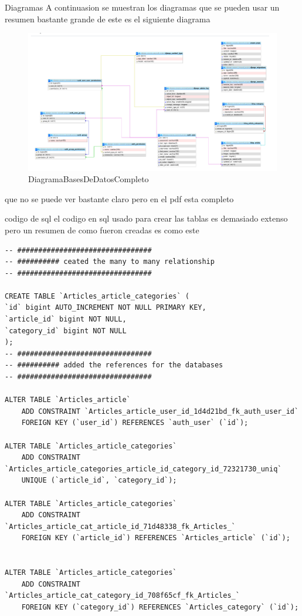 \documentclass[15pt]{extarticle}
\begin{document}
\begin{subsection}{Diagramas}
	A continuasion se muestran los diagramas que se pueden usar
	un resumen bastante grande de este es el siguiente diagrama

	\begin{figure}[h]
		\begin{center}
			\includegraphics[scale=0.7]{img_presentation/DiagramaBasesDeDatos.png}
			\caption{DiagramaBasesDeDatosCompleto}
		\end{center}
	\end{figure}

	que no se puede ver bastante claro pero en el pdf esta completo


\end{subsection}

\begin{subsection}{codigo de sql}
	el codigo en sql usado para crear las tablas es demasiado extenso pero un
	resumen de como fueron creadas es como este
\begin{verbatim}
-- ################################
-- ########## ceated the many to many relationship
-- ################################

CREATE TABLE `Articles_article_categories` (
`id` bigint AUTO_INCREMENT NOT NULL PRIMARY KEY,
`article_id` bigint NOT NULL,
`category_id` bigint NOT NULL
);
-- ################################
-- ########## added the references for the databases
-- ################################

ALTER TABLE `Articles_article`
	ADD CONSTRAINT `Articles_article_user_id_1d4d21bd_fk_auth_user_id`
	FOREIGN KEY (`user_id`) REFERENCES `auth_user` (`id`);

ALTER TABLE `Articles_article_categories`
	ADD CONSTRAINT `Articles_article_categories_article_id_category_id_72321730_uniq`
	UNIQUE (`article_id`, `category_id`);

ALTER TABLE `Articles_article_categories`
	ADD CONSTRAINT `Articles_article_cat_article_id_71d48338_fk_Articles_`
	FOREIGN KEY (`article_id`) REFERENCES `Articles_article` (`id`);


ALTER TABLE `Articles_article_categories`
	ADD CONSTRAINT `Articles_article_cat_category_id_708f65cf_fk_Articles_`
	FOREIGN KEY (`category_id`) REFERENCES `Articles_category` (`id`);

	\end{verbatim}
\end{subsection}
\end{document}

